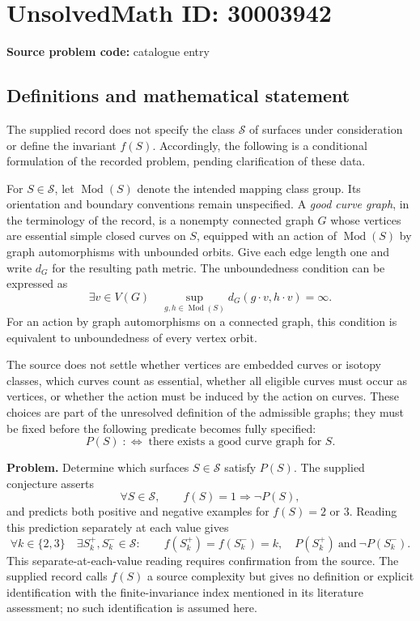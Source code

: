 \documentclass[11pt]{article}
\begin{document}
\section*{UnsolvedMath ID: 30003942}
\textbf{Source problem code:} catalogue entry
\subsection{Definitions and mathematical statement}
The supplied record does not specify the class \(\mathscr S\) of surfaces under consideration or define the invariant \(f(S)\). Accordingly, the following is a conditional formulation of the recorded problem, pending clarification of these data.

For \(S\in\mathscr S\), let \(\operatorname{Mod}(S)\) denote the intended mapping class group. Its orientation and boundary conventions remain unspecified. A \emph{good curve graph}, in the terminology of the record, is a nonempty connected graph \(G\) whose vertices are essential simple closed curves on \(S\), equipped with an action of \(\operatorname{Mod}(S)\) by graph automorphisms with unbounded orbits. Give each edge length one and write \(d_G\) for the resulting path metric. The unboundedness condition can be expressed as
\[
\exists v\in V(G)\quad
\sup_{g,h\in\operatorname{Mod}(S)}d_G(g\cdot v,h\cdot v)=\infty.
\]
For an action by graph automorphisms on a connected graph, this condition is equivalent to unboundedness of every vertex orbit.

The source does not settle whether vertices are embedded curves or isotopy classes, which curves count as essential, whether all eligible curves must occur as vertices, or whether the action must be induced by the action on curves. These choices are part of the unresolved definition of the admissible graphs; they must be fixed before the following predicate becomes fully specified:
\[
P(S)\;:\Longleftrightarrow\;
\text{there exists a good curve graph for }S.
\]

\textbf{Problem.} Determine which surfaces \(S\in\mathscr S\) satisfy \(P(S)\). The supplied conjecture asserts
\[
\forall S\in\mathscr S,\qquad f(S)=1\Longrightarrow\neg P(S),
\]
and predicts both positive and negative examples for \(f(S)=2\) or \(3\). Reading this prediction separately at each value gives
\[
\forall k\in\{2,3\}\quad
\exists S_k^+,S_k^-\in\mathscr S:\qquad
f(S_k^+)=f(S_k^-)=k,\quad
P(S_k^+)\ \text{and}\ \neg P(S_k^-).
\]
This separate-at-each-value reading requires confirmation from the source. The supplied record calls \(f(S)\) a source complexity but gives no definition or explicit identification with the finite-invariance index mentioned in its literature assessment; no such identification is assumed here.
\end{document}
